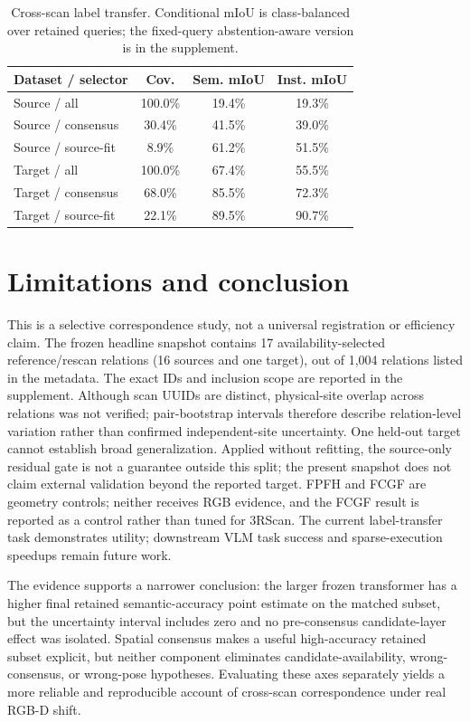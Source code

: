 \documentclass[10pt,twocolumn]{article}
\begin{document}
\begin{table}[t]
\centering
\caption{Cross-scan label transfer. Conditional mIoU is class-balanced over
retained queries; the fixed-query abstention-aware version is in the supplement.}
\label{tab:transfer}
\small
\begin{tabular}{lccc}
\toprule
Dataset / selector & Cov. & Sem. mIoU & Inst. mIoU \\
\midrule
Source / all & 100.0\% & 19.4\% & 19.3\% \\
Source / consensus & 30.4\% & 41.5\% & 39.0\% \\
Source / source-fit & 8.9\% & 61.2\% & 51.5\% \\
Target / all & 100.0\% & 67.4\% & 55.5\% \\
Target / consensus & 68.0\% & 85.5\% & 72.3\% \\
Target / source-fit & 22.1\% & 89.5\% & 90.7\% \\
\bottomrule
\end{tabular}
\end{table}

\section{Limitations and conclusion}

This is a selective correspondence study, not a universal registration or
efficiency claim. The frozen headline snapshot contains 17 availability-selected
reference/rescan relations (16 sources and one target), out of 1,004 relations
listed in the metadata. The exact IDs and inclusion scope are reported in the
supplement. Although scan UUIDs are distinct, physical-site overlap across
relations was not verified; pair-bootstrap intervals therefore describe
relation-level variation rather than confirmed independent-site uncertainty.
One held-out target cannot establish broad generalization. Applied without
refitting, the source-only residual gate
is not a guarantee outside this split; the present snapshot does not claim
external validation beyond the reported target.
FPFH and FCGF are geometry controls;
neither receives RGB evidence, and the FCGF result is reported as a control
rather than tuned for 3RScan. The current label-transfer task demonstrates
utility; downstream VLM task success and sparse-execution speedups remain
future work.

The evidence supports a narrower conclusion: the larger frozen transformer has
a higher final retained semantic-accuracy point estimate on the matched subset,
but the uncertainty interval includes zero and no pre-consensus candidate-layer
effect was isolated. Spatial consensus makes a useful high-accuracy retained
subset explicit, but neither component eliminates candidate-availability,
wrong-consensus, or wrong-pose hypotheses. Evaluating these axes separately yields a more reliable
and reproducible account of cross-scan correspondence under real RGB-D shift.
\end{document}

